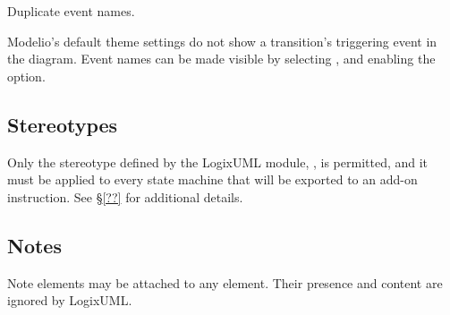                {Duplicate event names.}

Modelio's default theme settings do not show a transition's triggering
event in the diagram. Event names can be made visible by selecting
, and enabling the
 option.


\subsection{Stereotypes}

Only the stereotype defined by the LogixUML module,
, is permitted, and it must be applied to
every state machine that will be exported to an add-on instruction.
See \S\ref{??} for additional details.


\subsection{Notes}

Note elements may be attached to any element. Their presence and content
are ignored by LogixUML.
